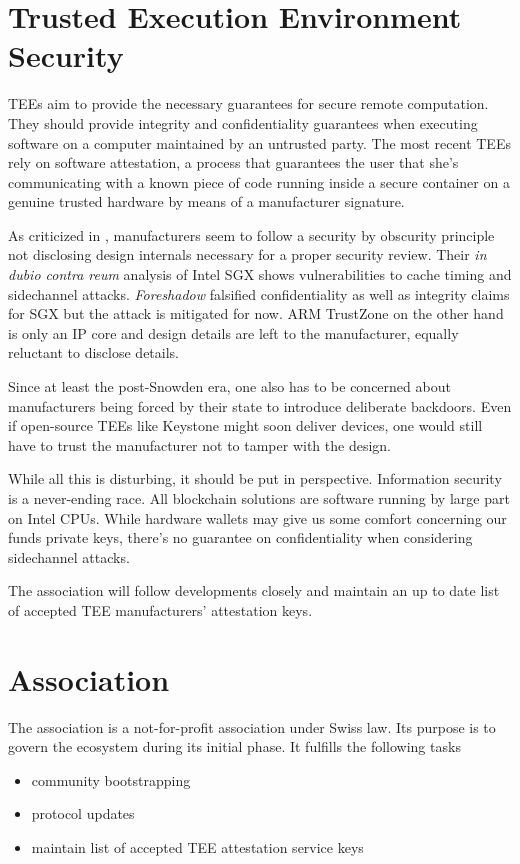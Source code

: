 \documentclass[conference]{IEEEtran}
\begin{document}
\section{Trusted Execution Environment Security}

TEEs aim to provide the necessary guarantees for secure remote computation. They should provide integrity and confidentiality guarantees when executing software on a computer maintained by an untrusted party. The most recent TEEs rely on software attestation, a process that guarantees the user that she's communicating with a known piece of code running inside a secure container on a genuine trusted hardware by means of a manufacturer signature.

As criticized in \cite{costan16}, manufacturers seem to follow a security by obscurity principle not disclosing design internals necessary for a proper security review. Their \textit{in dubio contra reum} analysis of Intel SGX shows vulnerabilities to cache timing and sidechannel attacks. \textit{Foreshadow} \cite{foreshadow} falsified confidentiality as well as integrity claims for SGX but the attack is mitigated for now. ARM TrustZone on the other hand is only an IP core and design details are left to the manufacturer, equally reluctant to disclose details. 

Since at least the post-Snowden era, one also has to be concerned about manufacturers being forced by their state to introduce deliberate backdoors. Even if open-source TEEs like Keystone \cite{keystone} might soon deliver devices, one would still have to trust the manufacturer not to tamper with the design. 

While all this is disturbing, it should be put in perspective. Information security is a never-ending race. All blockchain solutions are software running by large part on Intel CPUs. While hardware wallets may give us some comfort concerning our funds private keys, there's no guarantee on confidentiality when considering sidechannel attacks. 

The \encointer association will follow developments closely and maintain an up to date list of accepted TEE manufacturers' attestation keys. 

\section{\encointer Association}

The \encointer association is a not-for-profit association under Swiss law. Its purpose is to govern the \encointer ecosystem during its initial phase. It fulfills the following tasks
\begin{itemize}
	\item community bootstrapping
	\item protocol updates
	\item maintain list of accepted TEE attestation service keys
\end{itemize}
\end{document}
